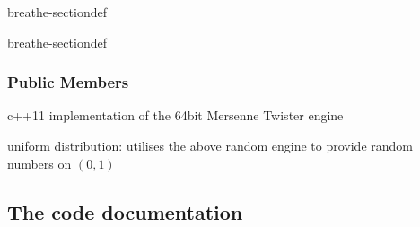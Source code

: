 \documentclass[letterpaper,10pt,english]{sphinxmanual}
\begin{document}
\begin{fulllineitems}
\begin{sphinxuseclass}{breathe-sectiondef}
\begin{fulllineitems}
\end{fulllineitems}


\end{sphinxuseclass}
\begin{sphinxuseclass}{breathe-sectiondef}\subsubsection*{Public Members}

\begin{fulllineitems}
\label{\detokenize{Simulation/SimulationCodeDoc:_CPPv4N7URandom7fEngineE}}
\pysigstartsignatures
\pysigstartmultiline
{}
\pysigstopmultiline
\pysigstopsignatures
\sphinxAtStartPar
c++11 implementation of the 64\sphinxhyphen{}bit Mersenne Twister engine 

\end{fulllineitems}


\begin{fulllineitems}
\label{\detokenize{Simulation/SimulationCodeDoc:_CPPv4N7URandom5fDistE}}
\pysigstartsignatures
\pysigstartmultiline
{}
\pysigstopmultiline
\pysigstopsignatures
\sphinxAtStartPar
uniform distribution: utilises the above random engine to provide random numbers on \((0,1)\)

\end{fulllineitems}


\end{sphinxuseclass}
\end{fulllineitems}



\subsection{The  code documentation}
\label{\detokenize{Simulation/SimulationCodeDoc:the-primarygenerator-code-documentation}}
\end{document}
